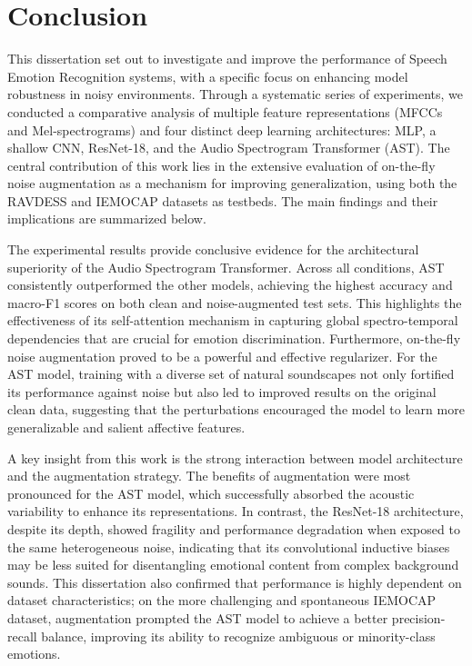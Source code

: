 
\chapter{Conclusion}

This dissertation set out to investigate and improve the performance of Speech Emotion Recognition systems, with a specific focus on enhancing model robustness in noisy environments. Through a systematic series of experiments, we conducted a comparative analysis of multiple feature representations (MFCCs and Mel-spectrograms) and four distinct deep learning architectures: MLP, a shallow CNN, ResNet-18, and the Audio Spectrogram Transformer (AST). The central contribution of this work lies in the extensive evaluation of on-the-fly noise augmentation as a mechanism for improving generalization, using both the RAVDESS and IEMOCAP datasets as testbeds. The main findings and their implications are summarized below.

The experimental results provide conclusive evidence for the architectural superiority of the Audio Spectrogram Transformer. Across all conditions, AST consistently outperformed the other models, achieving the highest accuracy and macro-F1 scores on both clean and noise-augmented test sets. This highlights the effectiveness of its self-attention mechanism in capturing global spectro-temporal dependencies that are crucial for emotion discrimination. Furthermore, on-the-fly noise augmentation proved to be a powerful and effective regularizer. For the AST model, training with a diverse set of natural soundscapes not only fortified its performance against noise but also led to improved results on the original clean data, suggesting that the perturbations encouraged the model to learn more generalizable and salient affective features.


A key insight from this work is the strong interaction between model architecture and the augmentation strategy. The benefits of augmentation were most pronounced for the AST model, which successfully absorbed the acoustic variability to enhance its representations. In contrast, the ResNet-18 architecture, despite its depth, showed fragility and performance degradation when exposed to the same heterogeneous noise, indicating that its convolutional inductive biases may be less suited for disentangling emotional content from complex background sounds. This dissertation also confirmed that performance is highly dependent on dataset characteristics; on the more challenging and spontaneous IEMOCAP dataset, augmentation prompted the AST model to achieve a better precision-recall balance, improving its ability to recognize ambiguous or minority-class emotions.


